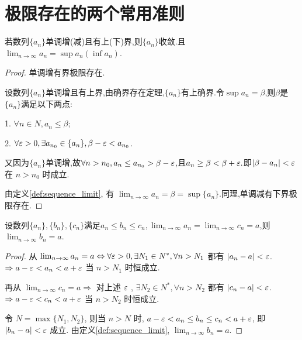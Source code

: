 \section{极限存在的两个常用准则}

\begin{theorem}[单调有界极限存在准则]\label{thm:monotone_convergence_theorem}
    若数列$\{a_n\}$单调增(减)且有上(下)界,则$\{a_n\}$收敛.且$\lim_{n \to \infty} a_n=\sup a_n(\inf a_n)$.
    
\end{theorem}

\begin{proof}单调增有界极限存在.

设数列$\{a_n\}$单调增且有上界,由确界存在定理,$\{a_n\}$有上确界.令$\sup a_n=\beta$,则$\beta$是$\{a_n\}$满足以下两点:

1. $\forall n\in N, a_n\leq \beta$;

2. $\forall \varepsilon >0, \exists a_{n_0}\in \{a_n\}, \beta-\varepsilon<a_{n_0}$.

又因为$\{a_n\}$单调增,故$\forall n > n_0, a_n\leq a_{n_0} > \beta-\varepsilon$,且$a_n \geq \beta <\beta +\varepsilon.$即$|\beta-a_n|<\varepsilon$ 在 $n>n_0$ 时成立.

由定义\ref{def:sequence_limit}, 有 $\lim_{n \to \infty} a_n=\beta = \sup \{ a_n \}$.同理,单调减有下界极限存在.
\end{proof}

\begin{theorem}[夹逼准则]\label{thm:squeeze_theorem}
    设数列$\{a_n\},\{b_n\},\{c_n\}$满足$a_n\leq b_n\leq c_n, \lim_{n \to \infty} a_n=\lim_{n \to \infty} c_n=a$,则$\lim_{n \to \infty} b_n=a$.
\end{theorem}

\begin{proof}
    从 $\lim_{n \to \infty} a_n = a \Leftrightarrow \forall \varepsilon >0, \exists N_1\in N^*, \forall n>N_1$ 都有 $|a_n-a|<\varepsilon$. $ \Rightarrow a-\varepsilon<a_n<a+\varepsilon$ 当 $n>N_1$ 时恒成立.

    再从 $\lim_{n \to \infty} c_n = a \Rightarrow $ 对上述 $\varepsilon$ , $\exists N_2\in N^*, \forall n>N_2$ 都有 $|c_n-a|<\varepsilon$. $ \Rightarrow a-\varepsilon<c_n<a+\varepsilon$ 当 $n>N_2$ 时恒成立.

    令 $N=\max\{N_1,N_2\}$, 则当 $n>N$ 时, $a-\varepsilon<a_n\leq b_n\leq c_n<a+\varepsilon$, 即 $|b_n-a|<\varepsilon$ 成立. 由定义\ref{def:sequence_limit}, $\lim_{n \to \infty} b_n=a$.


\end{proof}

